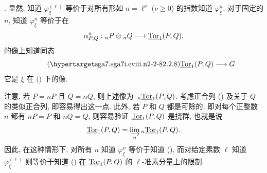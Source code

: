 . 显然, 知道 $\varphi^{(\ell)}_\xi$ 等价于对所有形如 $n=\ell^\nu$ ($\nu\geq0$) 的指数知道 $\varphi^n_\xi$. 对于固定的 $n$, 知道 $\varphi^n_\xi$ 等价于在
\[
 \alpha^n_{P,Q}:{}_nP\otimes{}_nQ\longrightarrow\uTor_1(P,Q),
\]
的像上知道同态
\begin{equation}\tag{\SGARefTarget{sga7.sga7i.eviii.n2-2-8}{2.2.8}}
 \uTor_1(P,Q)\longrightarrow G
\end{equation}
它是 $\xi$ 在 () 下的像.

注意, 若 $P=nP$ 且 $Q=nQ$, 则上述像为 $\,{}_n\uTor_1(P,Q)$. 考虑正合列 () 及关于 $Q$ 的类似正合列, 即容易得出这一点. 此外, 若 $P$ 和 $Q$ 都是可除的, 即对每个正整数 $n$ 都有 $nP=P$ 和 $nQ=Q$, 则容易验证 $\uTor_1(P,Q)$ 是挠群, 也就是说
\[
 \uTor_1(P,Q)=\varinjlim_n{}_{n}\uTor_1(P,Q).
\]
因此, 在这种情形下, 对所有 $n$ 知道 $\varphi^n_\xi$ 等价于知道 (), 而对给定素数 $\ell$ 知道 $\varphi^{(\ell)}_\xi$ 则等价于知道 () 在 $\uTor_1(P,Q)$ 的 $\ell$-准素分量上的限制.

